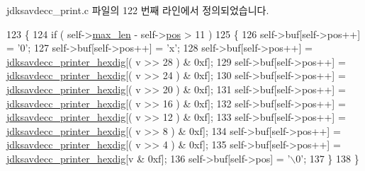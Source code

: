 jdksavdecc\+\_\+print.\+c 파일의 122 번째 라인에서 정의되었습니다.


\begin{DoxyCode}
123 \{
124     \textcolor{keywordflow}{if} ( self->\hyperlink{structjdksavdecc__printer_a956cb5a3c4322e6d67c2f2b21077716c}{max\_len} - self->\hyperlink{structjdksavdecc__printer_a5438a597ee291f523ae04a9fe355924f}{pos} > 11 )
125     \{
126         \textcolor{keyword}{self}->buf[\textcolor{keyword}{self}->pos++] = \textcolor{charliteral}{'0'};
127         \textcolor{keyword}{self}->buf[\textcolor{keyword}{self}->pos++] = \textcolor{charliteral}{'x'};
128         \textcolor{keyword}{self}->buf[\textcolor{keyword}{self}->pos++] = \hyperlink{jdksavdecc__print_8c_ad23c15dfac839a83ff16748e1737ba80}{jdksavdecc\_printer\_hexdig}[( v >> 28 ) & 0xf];
129         \textcolor{keyword}{self}->buf[\textcolor{keyword}{self}->pos++] = \hyperlink{jdksavdecc__print_8c_ad23c15dfac839a83ff16748e1737ba80}{jdksavdecc\_printer\_hexdig}[( v >> 24 ) & 0xf];
130         \textcolor{keyword}{self}->buf[\textcolor{keyword}{self}->pos++] = \hyperlink{jdksavdecc__print_8c_ad23c15dfac839a83ff16748e1737ba80}{jdksavdecc\_printer\_hexdig}[( v >> 20 ) & 0xf];
131         \textcolor{keyword}{self}->buf[\textcolor{keyword}{self}->pos++] = \hyperlink{jdksavdecc__print_8c_ad23c15dfac839a83ff16748e1737ba80}{jdksavdecc\_printer\_hexdig}[( v >> 16 ) & 0xf];
132         \textcolor{keyword}{self}->buf[\textcolor{keyword}{self}->pos++] = \hyperlink{jdksavdecc__print_8c_ad23c15dfac839a83ff16748e1737ba80}{jdksavdecc\_printer\_hexdig}[( v >> 12 ) & 0xf];
133         \textcolor{keyword}{self}->buf[\textcolor{keyword}{self}->pos++] = \hyperlink{jdksavdecc__print_8c_ad23c15dfac839a83ff16748e1737ba80}{jdksavdecc\_printer\_hexdig}[( v >> 8 ) & 0xf];
134         \textcolor{keyword}{self}->buf[\textcolor{keyword}{self}->pos++] = \hyperlink{jdksavdecc__print_8c_ad23c15dfac839a83ff16748e1737ba80}{jdksavdecc\_printer\_hexdig}[( v >> 4 ) & 0xf];
135         \textcolor{keyword}{self}->buf[\textcolor{keyword}{self}->pos++] = \hyperlink{jdksavdecc__print_8c_ad23c15dfac839a83ff16748e1737ba80}{jdksavdecc\_printer\_hexdig}[v & 0xf];
136         \textcolor{keyword}{self}->buf[\textcolor{keyword}{self}->pos] = \textcolor{charliteral}{'\(\backslash\)0'};
137     \}
138 \}
\end{DoxyCode}


